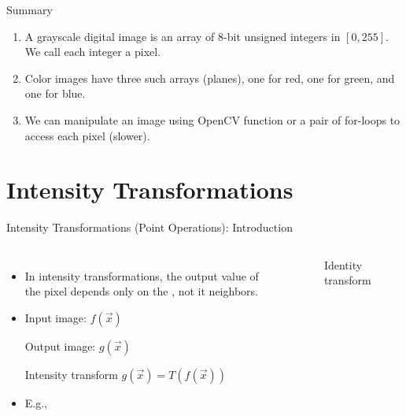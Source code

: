 \begin{frame}{Summary}
    \begin{enumerate}
      \item A grayscale digital image is an array of 8-bit unsigned integers in $[0,255]$. We call each integer a pixel.
      \item Color images have three such arrays (planes), one for red, one for green, and one for blue.
      \item We can manipulate an image using OpenCV function or a pair of for-loops to access each pixel (slower).
    \end{enumerate}
\end{frame}







\section{Intensity Transformations}




\begin{frame}{Intensity Transformations (Point Operations): Introduction}
    \begin{columns}[t]
        \begin{itemize}
          \item In intensity transformations, the output value of the pixel depends only on the , not it neighbors.
          \item Input image: $f(\vec{x})$\par Output image: $g(\vec{x})$ \par Intensity transform $g(\vec{x}) = T(f(\vec{x}))$
          \item E.g., 
        \end{itemize}
        \begin{figure}
          \centering
            
          \caption{Identity transform}
        \end{figure}
    \end{columns}

\end{frame}


